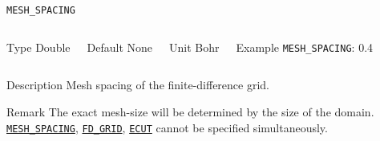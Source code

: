 \begin{frame}[allowframebreaks]{\texttt{MESH\_SPACING}} \label{MESH_SPACING}
\vspace*{-12pt}
\begin{columns}
\begin{block}{Type}
Double
\end{block}

\begin{block}{Default}
None
\end{block}

\begin{block}{Unit}
Bohr
\end{block}

\begin{block}{Example}
\texttt{MESH\_SPACING}: 0.4
\end{block}
\end{columns}

\begin{block}{Description}
Mesh spacing of the finite-difference grid. 
\end{block}

\begin{block}{Remark}
The exact mesh-size will be determined by the size of the domain.  \hyperlink{MESH_SPACING}{\texttt{MESH\_SPACING}}, \hyperlink{FD_GRID}{\texttt{FD\_GRID}}, \hyperlink{ECUT}{\texttt{ECUT}} cannot be specified simultaneously.
\end{block}

\end{frame}




